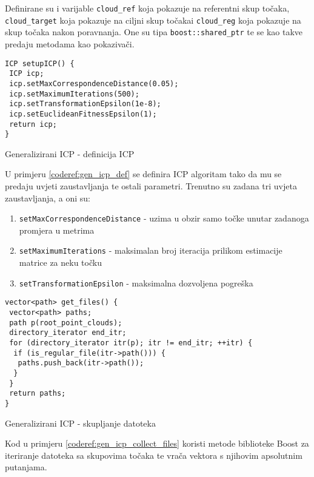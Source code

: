 Definirane su i varijable \texttt{cloud_ref} koja pokazuje na referentni skup točaka, \texttt{cloud_target} koja pokazuje na ciljni skup točakai \texttt{cloud_reg} koja pokazuje na skup točaka nakon poravnanja. One su tipa \texttt{boost::shared_ptr} te se kao takve predaju metodama kao pokazivači.

\begin{listing}[h!]
  \begin{verbatim}
ICP setupICP() {
 ICP icp;
 icp.setMaxCorrespondenceDistance(0.05);
 icp.setMaximumIterations(500);
 icp.setTransformationEpsilon(1e-8);
 icp.setEuclideanFitnessEpsilon(1);
 return icp;
}
  \end{verbatim}
  \caption{Generalizirani ICP - definicija ICP}
  \label{coderef:gen_icp_def}
\end{listing}

U primjeru \ref{coderef:gen_icp_def} se definira ICP algoritam tako da mu se predaju uvjeti zaustavljanja te ostali parametri. Trenutno su zadana tri uvjeta zaustavljanja, a oni su:

\begin{enumerate}
  \item \texttt{setMaxCorrespondenceDistance} - uzima u obzir samo točke unutar zadanoga promjera u metrima
  \item \texttt{setMaximumIterations} - maksimalan broj iteracija prilikom estimacije matrice za neku točku
  \item \texttt{setTransformationEpsilon} - maksimalna dozvoljena pogreška
\end{enumerate}

\begin{listing}[h!]
  \begin{verbatim}
vector<path> get_files() {
 vector<path> paths;
 path p(root_point_clouds);
 directory_iterator end_itr;
 for (directory_iterator itr(p); itr != end_itr; ++itr) {
  if (is_regular_file(itr->path())) {
   paths.push_back(itr->path());
  }
 }
 return paths;
}
  \end{verbatim}
  \caption{Generalizirani ICP - skupljanje datoteka}
  \label{coderef:gen_icp_collect_files}
\end{listing}

Kod u primjeru \ref{coderef:gen_icp_collect_files} koristi metode biblioteke Boost za iteriranje datoteka sa skupovima točaka te vrača vektora s njihovim apsolutnim putanjama.

